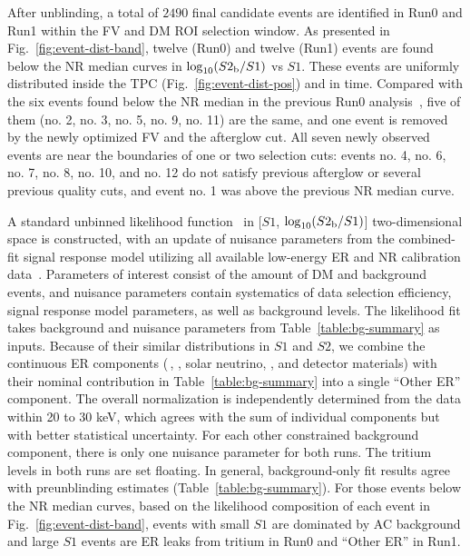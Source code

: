 \documentclass[%
 reprint,
superscriptaddress,
 amsmath,amssymb,
 aps,
 prl,
]{revtex4-1}
\begin{document}
After unblinding, a total of $2490$ final candidate events are identified in Run0 and Run1 within the FV and DM ROI selection window.
As presented in Fig.~\ref{fig:event-dist-band}, twelve (Run0) and twelve (Run1) events are found below the NR median curves in $\log_{10}(S2_{\rm b}/S1)$ vs $S1$.
These events are uniformly distributed inside the TPC (Fig.~\ref{fig:event-dist-pos}) and in time. 
Compared with the six events found below the NR median in the previous Run0 analysis~\cite{Meng2021_P4First}, five of them (no. 2, no. 3, no. 5, no. 9, no. 11) are the same, %
and one event is removed by the newly optimized FV and the afterglow cut. All seven newly observed events are near the boundaries of one or two selection cuts: events no. 4, no. 6, no. 7, no. 8, no. 10, and no. 12 do not satisfy previous afterglow or several previous quality cuts, and event no. 1 was above the previous NR median curve.


A standard unbinned likelihood function~\cite{Gu2022_P4NRAbsp, Ning2023_EFT} in [$S1$, $\log_{10}(S2_{\rm b}/S1)$] two-dimensional space is constructed, with an update of nuisance parameters from the combined-fit signal response model utilizing all available low-energy ER and NR calibration data~\cite{Luo2024_P4SignalModel}.
Parameters of interest consist of the amount of DM and background events, and nuisance parameters contain systematics of data selection efficiency, signal response model parameters, as well as background levels.
The likelihood fit takes background and nuisance parameters from Table~\ref{table:bg-summary} as inputs.
Because of their similar distributions in $S1$ and $S2$, we combine the continuous ER components (\,, , solar neutrino, , and detector materials) with their nominal contribution in Table~\ref{table:bg-summary} into a single ``Other ER'' component.
The overall normalization is independently determined from the data within 20 to 30 keV, which agrees with the sum of individual components but with better statistical uncertainty.
For each other constrained background component, there is only one nuisance parameter for both runs.
The tritium levels in both runs are set floating. 
In general, background-only fit results agree with preunblinding estimates (Table~\ref{table:bg-summary}). 
For those events below the NR median curves, based on the likelihood composition of each event in Fig.~\ref{fig:event-dist-band}, events with small $S1$ are dominated by AC background and large $S1$ events are ER leaks from tritium in Run0 and ``Other ER'' in Run1.
\end{document}
